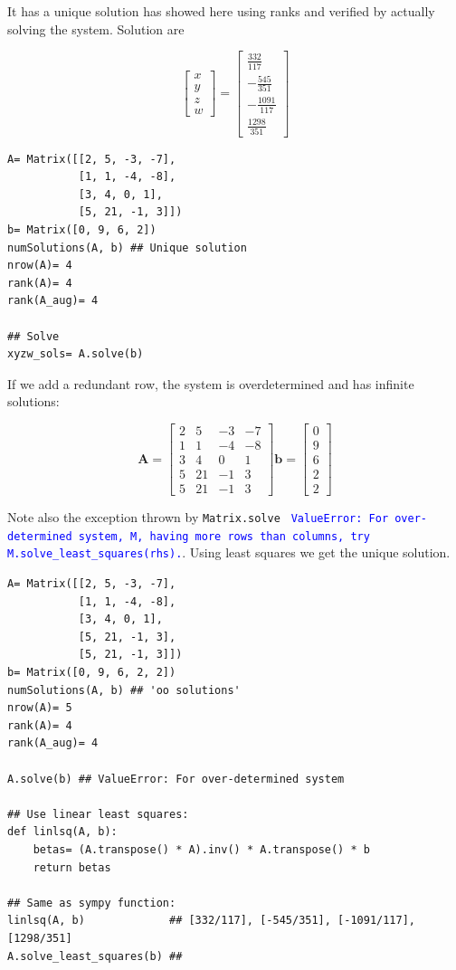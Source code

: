 It has a unique solution has showed here using ranks and verified by actually solving the
system. Solution are

$$
\left[\begin{matrix}x\\y\\z\\w\end{matrix}\right] =
\left[\begin{matrix}\frac{332}{117}\\
                    - \frac{545}{351}\\
                    - \frac{1091}{117}\\
                      \frac{1298}{351}
    \end{matrix}\right]
$$

\begin{verbatim}
A= Matrix([[2, 5, -3, -7],
           [1, 1, -4, -8],
           [3, 4, 0, 1],
           [5, 21, -1, 3]])
b= Matrix([0, 9, 6, 2])
numSolutions(A, b) ## Unique solution
nrow(A)= 4
rank(A)= 4
rank(A_aug)= 4

## Solve
xyzw_sols= A.solve(b)
\end{verbatim}

If we add a redundant row, the system is overdetermined and has infinite solutions:

$$
\mathbf{A}= \left[\begin{matrix}2 & 5 & -3 & -7\\1 & 1 & -4 & -8\\3 & 4 & 0 & 1\\5 & 21 & -1 & 3\\5 & 21 & -1 & 3\end{matrix}\right]
\mathbf{b}= \left[\begin{matrix}0\\9\\6\\2\\2\end{matrix}\right]
$$

Note also the exception thrown by \texttt{Matrix.solve} \textcolor{blue}{\texttt{
ValueError: For over-determined system, M, having more rows than columns,
try M.solve\_least\_squares(rhs).}}. Using least squares we get the
unique solution.

\begin{verbatim}
A= Matrix([[2, 5, -3, -7],
           [1, 1, -4, -8],
           [3, 4, 0, 1],
           [5, 21, -1, 3],
           [5, 21, -1, 3]])
b= Matrix([0, 9, 6, 2, 2])
numSolutions(A, b) ## 'oo solutions'
nrow(A)= 5
rank(A)= 4
rank(A_aug)= 4

A.solve(b) ## ValueError: For over-determined system

## Use linear least squares:
def linlsq(A, b):
    betas= (A.transpose() * A).inv() * A.transpose() * b
    return betas

## Same as sympy function:
linlsq(A, b)             ## [332/117], [-545/351], [-1091/117], [1298/351]
A.solve_least_squares(b) ## 
\end{verbatim}

